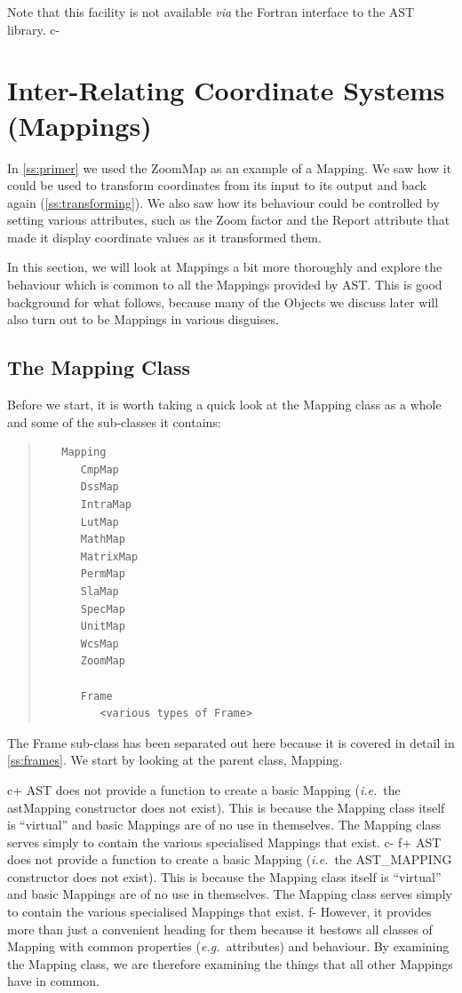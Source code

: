 \documentclass[twoside,11pt]{article}
\newcommand{\secref}[1]{\S\ref{#1}}
\renewcommand{\secref}[1]{\ref{#1}}
\begin{document}
Note that this facility is not available {\em{via}} the Fortran
interface to the AST library.
c-

\cleardoublepage
\section{\label{ss:mappings}Inter-Relating Coordinate Systems (Mappings)}

In \secref{ss:primer} we used the ZoomMap as an example of a
Mapping. We saw how it could be used to transform coordinates from its
input to its output and back again (\secref{ss:transforming}). We also
saw how its behaviour could be controlled by setting various
attributes, such as the Zoom factor and the Report attribute that made
it display coordinate values as it transformed them.

In this section, we will look at Mappings a bit more thoroughly and
explore the behaviour which is common to all the Mappings provided by
AST.  This is good background for what follows, because many of the
Objects we discuss later will also turn out to be Mappings in various
disguises.

\subsection{\label{ss:mappingclass}The Mapping Class}

Before we start, it is worth taking a quick look at the Mapping class
as a whole and some of the sub-classes it contains:

\begin{quote}
\begin{verbatim}
   Mapping
      CmpMap
      DssMap
      IntraMap
      LutMap
      MathMap
      MatrixMap
      PermMap
      SlaMap
      SpecMap
      UnitMap
      WcsMap
      ZoomMap

      Frame
         <various types of Frame>
\end{verbatim}
\end{quote}

The Frame sub-class has been separated out here because it is covered
in detail in \secref{ss:frames}. We start by looking at the parent
class, Mapping.

c+
AST does not provide a function to create a basic Mapping
({\em{i.e.}}\ the astMapping constructor does not exist). This is
because the Mapping class itself is ``virtual'' and basic Mappings are
of no use in themselves. The Mapping class serves simply to contain
the various specialised Mappings that exist.
c-
f+
AST does not provide a function to create a basic Mapping
({\em{i.e.}}\ the AST\_MAPPING constructor does not exist). This is
because the Mapping class itself is ``virtual'' and basic Mappings are
of no use in themselves. The Mapping class serves simply to contain
the various specialised Mappings that exist.
f-
However, it provides more than just a convenient heading for them
because it bestows all classes of Mapping with common properties
({\em{e.g.}}\ attributes) and behaviour.  By examining the Mapping
class, we are therefore examining the things that all other Mappings
have in common.
\end{document}
